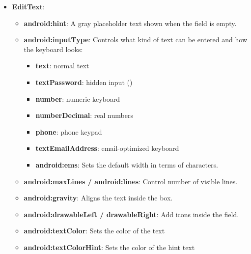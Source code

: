 \documentclass{report}
\begin{document}
\begin{itemize}
        \item \textbf{EditText}: 
            \begin{itemize}
                \item \textbf{android:hint}:  A gray placeholder text shown when the field is empty.
                \item \textbf{android:inputType}:  Controls what kind of text can be entered and how the keyboard looks:
                \begin{itemize}
                    \item \textbf{text}: normal text
                    \item \textbf{textPassword}: hidden input (\bullet\bullet\bullet\bullet)
                    \item \textbf{number}: numeric keyboard
                    \item \textbf{numberDecimal}: real numbers
                    \item \textbf{phone}: phone keypad
                    \item \textbf{textEmailAddress}: email-optimized keyboard
                    \item \textbf{android:ems}: Sets the default width in terms of characters.
            \end{itemize}
                \item \textbf{android:maxLines / android:lines}: Control number of visible lines.
                \item \textbf{android:gravity}: Aligns the text inside the box.
                \item \textbf{android:drawableLeft / drawableRight}: Add icons inside the field.
                \item \textbf{android:textColor}: Sets the color of the text
                \item \textbf{android:textColorHint}: Sets the color of the hint text
            \end{itemize}
    \end{itemize}

    \pagebreak 
\end{document}

